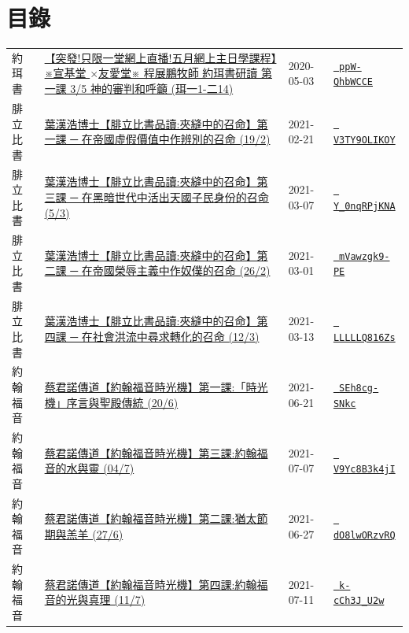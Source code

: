 \documentclass{book}
\begin{document}
\section{目錄}
\label{sec:index}
{ \scriptsize


\begin{xltabular}{\textwidth}{|p{0.15\textwidth} p{0.6\textwidth}|p{0.07\textwidth} p{0.1\textwidth}|}
\hline
約珥書   & \hyperref[sec:ppW_QhbWCCE]{【突發!只限一堂網上直播!五月網上主日學課程】※宣基堂 $\times$友愛堂※ 程展鵬牧師 約珥書研讀 第一課 3/5 神的審判和呼籲 (珥一1-二14)} & 2020-05-03 & \href{https://youtube.com/watch?v=ppW-QhbWCCE}{\texttt{ ppW-QhbWCCE}} \\
腓立比書   & \hyperref[sec:V3TY9OLIKOY]{葉漢浩博士【腓立比書品讀:夾縫中的召命】第一課 ─ 在帝國虛假價值中作辨別的召命 (19/2)} & 2021-02-21 & \href{https://youtube.com/watch?v=V3TY9OLIKOY}{\texttt{ V3TY9OLIKOY}} \\
腓立比書   & \hyperref[sec:Y_0nqRPjKNA]{葉漢浩博士【腓立比書品讀:夾縫中的召命】第三課 ─ 在黑暗世代中活出天國子民身份的召命 (5/3)} & 2021-03-07 & \href{https://youtube.com/watch?v=Y_0nqRPjKNA}{\texttt{ Y\_0nqRPjKNA}} \\
腓立比書   & \hyperref[sec:mVawzgk9_PE]{葉漢浩博士【腓立比書品讀:夾縫中的召命】第二課 ─ 在帝國榮辱主義中作奴僕的召命 (26/2)} & 2021-03-01 & \href{https://youtube.com/watch?v=mVawzgk9-PE}{\texttt{ mVawzgk9-PE}} \\
腓立比書   & \hyperref[sec:LLLLLQ816Zs]{葉漢浩博士【腓立比書品讀:夾縫中的召命】第四課 ─ 在社會洪流中尋求轉化的召命 (12/3)} & 2021-03-13 & \href{https://youtube.com/watch?v=LLLLLQ816Zs}{\texttt{ LLLLLQ816Zs}} \\
約翰福音   & \hyperref[sec:SEh8cg_SNkc]{蔡君諾傳道【約翰福音時光機】第一課:「時光機」序言與聖殿傳統 (20/6)} & 2021-06-21 & \href{https://youtube.com/watch?v=SEh8cg-SNkc}{\texttt{ SEh8cg-SNkc}} \\
約翰福音   & \hyperref[sec:V9Yc8B3k4jI]{蔡君諾傳道【約翰福音時光機】第三課:約翰福音的水與靈 (04/7)} & 2021-07-07 & \href{https://youtube.com/watch?v=V9Yc8B3k4jI}{\texttt{ V9Yc8B3k4jI}} \\
約翰福音   & \hyperref[sec:dO8lwORzvRQ]{蔡君諾傳道【約翰福音時光機】第二課:猶太節期與羔羊 (27/6)} & 2021-06-27 & \href{https://youtube.com/watch?v=dO8lwORzvRQ}{\texttt{ dO8lwORzvRQ}} \\
約翰福音   & \hyperref[sec:k_cCh3J_U2w]{蔡君諾傳道【約翰福音時光機】第四課:約翰福音的光與真理 (11/7)} & 2021-07-11 & \href{https://youtube.com/watch?v=k-cCh3J_U2w}{\texttt{ k-cCh3J\_U2w}} \\

\end{xltabular}}
\end{document}
